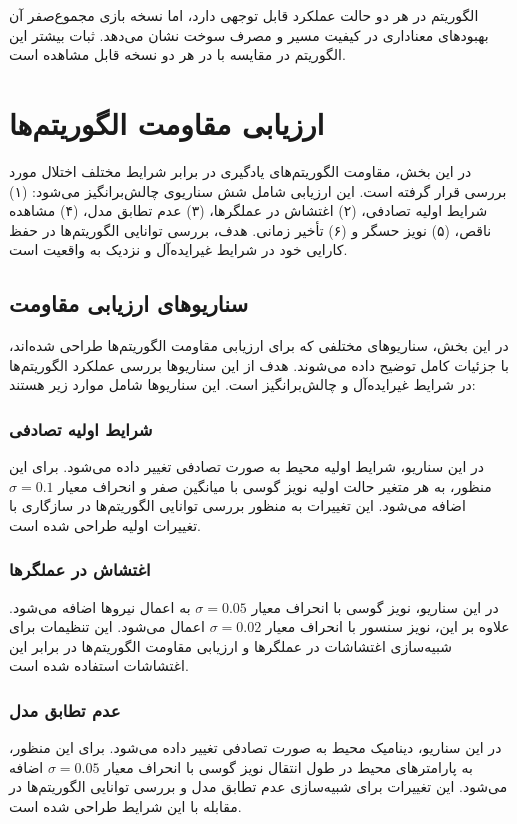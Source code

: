 الگوریتم  در هر دو حالت عملکرد قابل توجهی دارد، اما نسخه بازی مجموع‌صفر آن بهبودهای معناداری در کیفیت مسیر و مصرف سوخت نشان می‌دهد. ثبات بیشتر این الگوریتم در مقایسه با  در هر دو نسخه قابل مشاهده است.

\section{ارزیابی مقاومت الگوریتم‌ها}

در این بخش، مقاومت الگوریتم‌های یادگیری در برابر شرایط مختلف اختلال مورد بررسی قرار گرفته است. این ارزیابی شامل شش سناریوی چالش‌برانگیز می‌شود: (۱) شرایط اولیه تصادفی، (۲) اغتشاش در عملگرها، (۳) عدم تطابق مدل، (۴) مشاهده ناقص، (۵) نویز حسگر و (۶) تأخیر زمانی. هدف، بررسی توانایی الگوریتم‌ها در حفظ کارایی خود در شرایط غیرایده‌آل و نزدیک به واقعیت است.

\subsection{سناریوهای ارزیابی مقاومت}

در این بخش، سناریوهای مختلفی که برای ارزیابی مقاومت الگوریتم‌ها طراحی شده‌اند، با جزئیات کامل توضیح داده می‌شوند. هدف از این سناریوها بررسی عملکرد الگوریتم‌ها در شرایط غیرایده‌آل و چالش‌برانگیز است. این سناریوها شامل موارد زیر هستند:

\subsubsection{شرایط اولیه تصادفی}
در این سناریو، شرایط اولیه محیط به صورت تصادفی تغییر داده می‌شود. برای این منظور، به هر متغیر حالت اولیه نویز گوسی با میانگین صفر و انحراف معیار $\sigma = 0.1$ اضافه می‌شود. این تغییرات به منظور بررسی توانایی الگوریتم‌ها در سازگاری با تغییرات اولیه طراحی شده است.

\subsubsection{اغتشاش در عملگرها}
در این سناریو، نویز گوسی با انحراف معیار $\sigma = 0.05$ به اعمال نیروها اضافه می‌شود. علاوه بر این، نویز سنسور با انحراف معیار $\sigma = 0.02$ اعمال می‌شود. این تنظیمات برای شبیه‌سازی اغتشاشات در عملگرها و ارزیابی مقاومت الگوریتم‌ها در برابر این اغتشاشات استفاده شده است.

\subsubsection{عدم تطابق مدل}
در این سناریو، دینامیک محیط به صورت تصادفی تغییر داده می‌شود. برای این منظور، به پارامترهای محیط در طول انتقال نویز گوسی با انحراف معیار $\sigma = 0.05$ اضافه می‌شود. این تغییرات برای شبیه‌سازی عدم تطابق مدل و بررسی توانایی الگوریتم‌ها در مقابله با این شرایط طراحی شده است.

